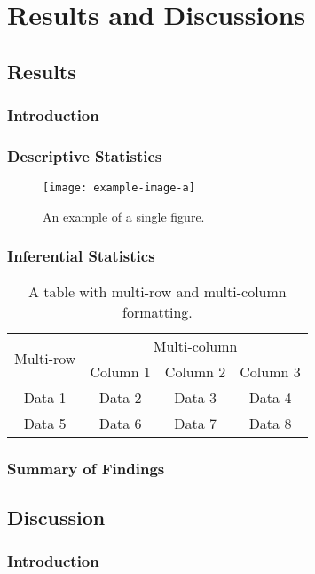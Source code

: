 \chapter{Results and Discussions}
\section{Results}
\subsection{Introduction}


\subsection{Descriptive Statistics}

\begin{figure}[ht]
    \centering
    \texttt{[image: example-image-a]}
    \caption{An example of a single figure.}
    \label{fig:single1}
\end{figure}
\subsection{Inferential Statistics}


\begin{table}[ht]
    \centering
    \begin{tabular}{|c|c|c|c|}
        \hline
        \multirow{2}{*}{Multi-row} & \multicolumn{3}{c|}{Multi-column} \\
        \cline{2-4}
         & Column 1 & Column 2 & Column 3 \\
        \hline
        Data 1 & Data 2 & Data 3 & Data 4 \\
        \hline
        Data 5 & Data 6 & Data 7 & Data 8 \\
        \hline
    \end{tabular}
    \caption{A table with multi-row and multi-column formatting.}
    \label{tab:multi}
\end{table}
\subsection{Summary of Findings}


\section{Discussion}
\subsection{Introduction}


